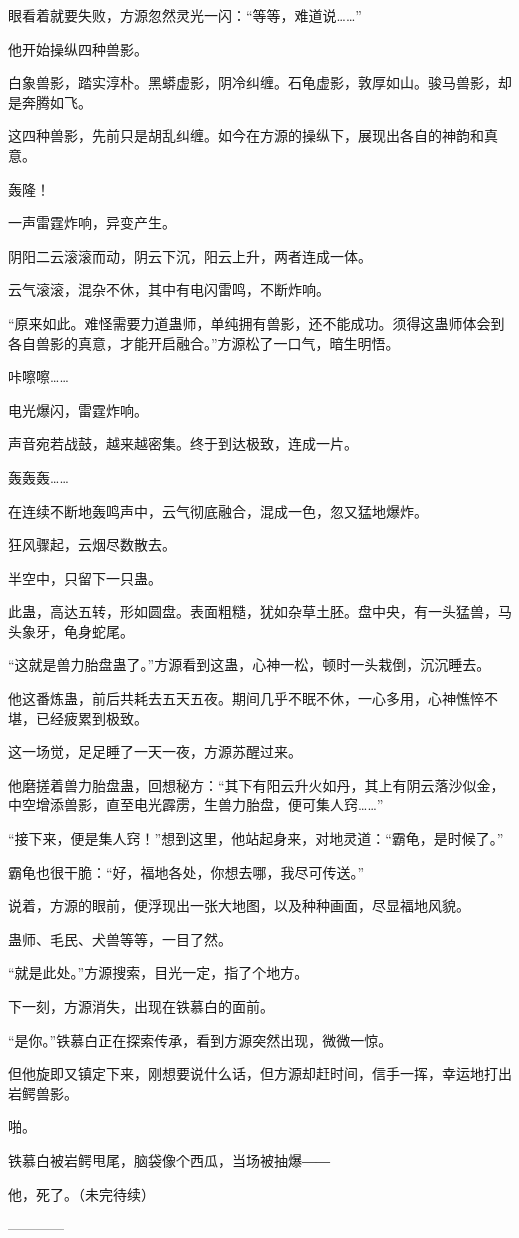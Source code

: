 \begin{this_body}
眼看着就要失败，方源忽然灵光一闪：“等等，难道说……”

他开始操纵四种兽影。

白象兽影，踏实淳朴。黑蟒虚影，阴冷纠缠。石龟虚影，敦厚如山。骏马兽影，却是奔腾如飞。

这四种兽影，先前只是胡乱纠缠。如今在方源的操纵下，展现出各自的神韵和真意。

轰隆！

一声雷霆炸响，异变产生。

阴阳二云滚滚而动，阴云下沉，阳云上升，两者连成一体。

云气滚滚，混杂不休，其中有电闪雷鸣，不断炸响。

“原来如此。难怪需要力道蛊师，单纯拥有兽影，还不能成功。须得这蛊师体会到各自兽影的真意，才能开启融合。”方源松了一口气，暗生明悟。

咔嚓嚓……

电光爆闪，雷霆炸响。

声音宛若战鼓，越来越密集。终于到达极致，连成一片。

轰轰轰……

在连续不断地轰鸣声中，云气彻底融合，混成一色，忽又猛地爆炸。

狂风骤起，云烟尽数散去。

半空中，只留下一只蛊。

此蛊，高达五转，形如圆盘。表面粗糙，犹如杂草土胚。盘中央，有一头猛兽，马头象牙，龟身蛇尾。

“这就是兽力胎盘蛊了。”方源看到这蛊，心神一松，顿时一头栽倒，沉沉睡去。

他这番炼蛊，前后共耗去五天五夜。期间几乎不眠不休，一心多用，心神憔悴不堪，已经疲累到极致。

这一场觉，足足睡了一天一夜，方源苏醒过来。

他磨搓着兽力胎盘蛊，回想秘方：“其下有阳云升火如丹，其上有阴云落沙似金，中空增添兽影，直至电光霹雳，生兽力胎盘，便可集人窍……”

“接下来，便是集人窍！”想到这里，他站起身来，对地灵道：“霸龟，是时候了。”

霸龟也很干脆：“好，福地各处，你想去哪，我尽可传送。”

说着，方源的眼前，便浮现出一张大地图，以及种种画面，尽显福地风貌。

蛊师、毛民、犬兽等等，一目了然。

“就是此处。”方源搜索，目光一定，指了个地方。

下一刻，方源消失，出现在铁慕白的面前。

“是你。”铁慕白正在探索传承，看到方源突然出现，微微一惊。

但他旋即又镇定下来，刚想要说什么话，但方源却赶时间，信手一挥，幸运地打出岩鳄兽影。

啪。

铁慕白被岩鳄甩尾，脑袋像个西瓜，当场被抽爆――

他，死了。（未完待续）

------------

\end{this_body}

